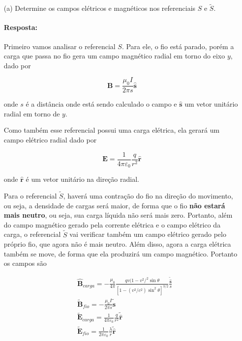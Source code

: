 \documentclass[10pt,a4paper]{article}
\begin{document}
\begin{itemize}
\item[(a)] Determine os campos elétricos e magnéticos nos referenciais $S$ e $\tilde{S}$.

\paragraph{Resposta:} Primeiro vamos analisar o referencial $S$. Para ele, o fio está parado, porém a carga que passa no fio gera um campo magnético radial em torno do eixo $y$, dado por 

\begin{equation*}
		\mathbf{B} = \frac{\mu_0I}{2\pi s}\mathbf{\hat{s}} 
\end{equation*}

onde $s$ é a distância onde está sendo calculado o campo e $\mathbf{\hat{s}}$ um vetor unitário radial em torno de $y$. 

Como também esse referencial possui uma carga elétrica, ela gerará um campo elétrico radial dado por 

\begin{equation*}
\mathbf{E} = \frac{1}{4\pi \varepsilon_0}\frac{q}{r^2}\mathbf{\hat{r}}
\end{equation*}

onde $\mathbf{\hat{r}}$ é um vetor unitário na direção radial. 

Para o referencial $\tilde{S}$, haverá uma contração do fio na direção do movimento, ou seja, a densidade de cargas será maior, de forma que o fio \textbf{não estará mais neutro}, ou seja, sua carga líquida não será mais zero. Portanto, além do campo magnético gerado pela corrente elétrica e o campo elétrico da carga, o referencial $\tilde{S}$ vai verificar também um campo elétrico gerado pelo próprio fio, que agora não é mais neutro. Além disso, agora a carga elétrica também se move, de forma que ela produzirá um campo magnético. Portanto os campos são 

\begin{align*}
&\mathbf{\hat{B}}_{carga}=-\frac{\mu_0}{4\pi}\frac{qv(1-v^2/^2\sin\theta}{[1-(v^2/c^2)\sin^2\theta]^{3/2}}\frac{\mathbf{\tilde{\hat{s}}}}{s}\\
&\mathbf{\tilde{B}}_{fio} = -\frac{\mu_0I}{2\pi s}\mathbf{\tilde{\hat{s}}} \\
&\mathbf{\tilde{E}}_{carga} = \frac{1}{4\pi \varepsilon_0}\frac{q}{r^2}\mathbf{\tilde{\hat{r}}}\\
&\mathbf{\tilde{E}}_{fio} = \frac{1}{2\pi \varepsilon_0}\frac{\lambda}{r}\mathbf{\tilde{\hat{r}}}
\end{align*}


\end{itemize}
\end{document}
